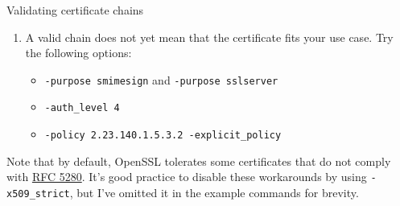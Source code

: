 \documentclass{practice}
\begin{document}
\begin{task}{Validating certificate chains}
\begin{enumerate}
    \begin{tcolorbox}[title=NB!]
      You should prefer \texttt{-crl\_check\_all} over \texttt{-crl\_check}.
      The latter option only checks the revocation status of the leaf certificate, so it misses revoked intermediates, even if you provide CRLs that list them (??!).
    \end{tcolorbox}

    \item A valid chain does not yet mean that the certificate fits your use case.
    Try the following options:
    \begin{itemize}
      \item \texttt{-purpose smimesign} and \texttt{-purpose sslserver}
      \item \texttt{-auth\_level 4}
      \item \texttt{-policy 2.23.140.1.5.3.2 -explicit\_policy}
    \end{itemize}
  \end{enumerate}

  Note that by default, OpenSSL tolerates some certificates that do not comply with \href{https://datatracker.ietf.org/doc/html/rfc5280}{RFC 5280}.
  It's good practice to disable these workarounds by using \texttt{-x509\_strict}, but I've omitted it in the example commands for brevity.
\end{task}
\end{document}

